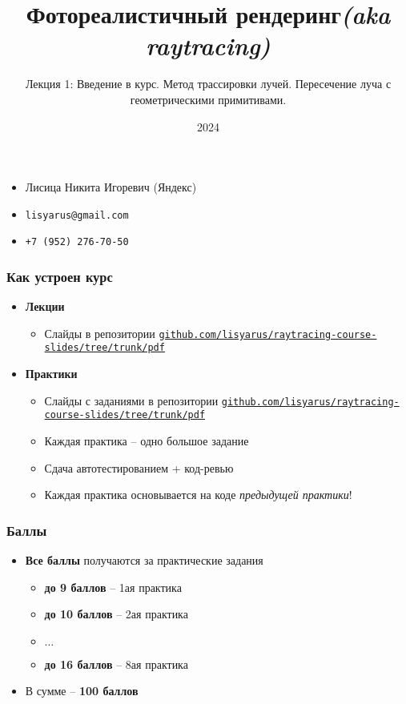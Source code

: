 \documentclass[10pt]{beamer}
\title{Фотореалистичный рендеринг\quad\quad\quad\quad\quad\quad \textit{(aka raytracing)}}
\subtitle{Лекция 1: Введение в курс. Метод трассировки лучей. Пересечение луча с геометрическими примитивами.}
\date{2024}
\begin{document}
\frame{\titlepage}

\begin{frame}
\frametitle{}
\begin{itemize}
\item Лисица Никита Игоревич (Яндекс)
\item \texttt{lisyarus@gmail.com}
\item \texttt{+7 (952) 276-70-50}
\end{itemize}
\end{frame}

\begin{frame}
\frametitle{Как устроен курс}
\begin{itemize}
\item \textbf{Лекции}
\begin{itemize}
\item Слайды в репозитории \href{https://github.com/lisyarus/raytracing-course-slides/tree/trunk/pdf}{\texttt{github.com/lisyarus/raytracing-course-slides/tree/trunk/pdf}}
\end{itemize}
\pause
\item \textbf{Практики}
\pause
\begin{itemize}
\item Слайды с заданиями в репозитории \href{https://github.com/lisyarus/raytracing-course-slides/tree/trunk/pdf}{\texttt{github.com/lisyarus/raytracing-course-slides/tree/trunk/pdf}}
\pause
\item Каждая практика -- одно большое задание
\pause
\item Сдача автотестированием + код-ревью
\pause
\item Каждая практика основывается на коде \textit{предыдущей практики}!
\end{itemize}
\end{itemize}
\end{frame}

\begin{frame}
\frametitle{Баллы}
\begin{itemize}
\pause
\item \textbf{Все баллы} получаются за практические задания
\pause
\begin{itemize}
\item \textbf{до 9 баллов} -- 1ая практика
\item \textbf{до 10 баллов} -- 2ая практика
\item \begin{math}\dots\end{math}
\item \textbf{до 16 баллов} -- 8ая практика
\end{itemize}
\pause
\item В сумме -- \textbf{100 баллов}
\end{itemize}
\end{frame}
\end{document}
